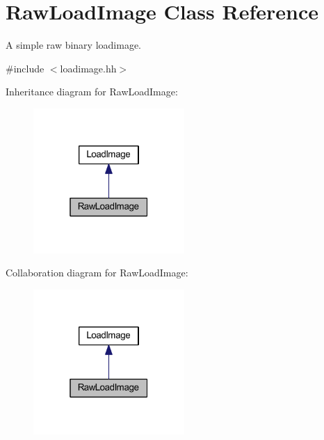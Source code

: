 \hypertarget{class_raw_load_image}{}\section{Raw\+Load\+Image Class Reference}
\label{class_raw_load_image}


A simple raw binary loadimage.  




{\ttfamily \#include $<$loadimage.\+hh$>$}



Inheritance diagram for Raw\+Load\+Image\+:
\nopagebreak
\begin{figure}[H]
\begin{center}
\leavevmode
\includegraphics[width=163pt]{class_raw_load_image__inherit__graph}
\end{center}
\end{figure}


Collaboration diagram for Raw\+Load\+Image\+:
\nopagebreak
\begin{figure}[H]
\begin{center}
\leavevmode
\includegraphics[width=163pt]{class_raw_load_image__coll__graph}
\end{center}
\end{figure}

